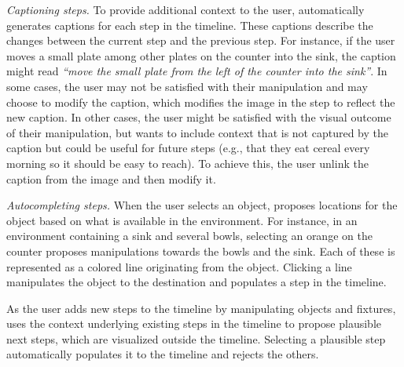 \noindent \emph{Captioning steps.} To provide additional context to the user, \projname automatically generates captions for each step in the timeline. These captions describe the changes between the current step and the previous step. For instance, if the user moves a small plate among other plates on the counter into the sink, the caption might read \textit{``move the small plate from the left of the counter into the sink''}. In some cases, the user may not be satisfied with their manipulation and may choose to modify the caption, which modifies the image in the step to reflect the new caption. In other cases, the user might be satisfied with the visual outcome of their manipulation, but wants to include context that is not captured by the caption but could be useful for future steps (e.g., that they eat cereal every morning so it should be easy to reach). To achieve this, the user unlink the caption from the image and then modify it.

\noindent \emph{Autocompleting steps.} When the user selects an object, \projname proposes locations for the object based on what is available in the environment. For instance, in an environment containing a sink and several bowls, selecting an orange on the counter proposes manipulations towards the bowls and the sink. Each of these is represented as a colored line originating from the object. Clicking a line manipulates the object to the destination and populates a step in the timeline.

As the user adds new steps to the timeline by manipulating objects and fixtures, \projname uses the context underlying existing steps in the timeline to propose plausible next steps, which are visualized outside the timeline. Selecting a plausible step automatically populates it to the timeline and rejects the others.











